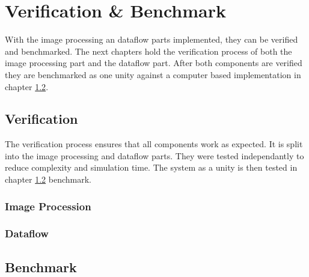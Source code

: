 %
%
\chapter{Verification \& Benchmark} \label{chapt:ver_bench}
With the image processing an dataflow parts implemented, they can be verified
and benchmarked. The next chapters hold the verification process of both the
image processing part and the dataflow part. After both components are verified
they are benchmarked as one unity against a computer based implementation in
chapter \ref{ch:benchmark}.

%
%
\section{Verification} \label{ch:verification}
The verification process ensures that all components work as expected. It is
split into the image processing and dataflow parts. They were tested
independantly to reduce complexity and simulation time. The system as a unity is
then tested in chapter \ref{ch:benchmark} benchmark.

%
%
\subsection{Image Procession}\label{ch:verification:imageprocessing}

%
%
\subsection{Dataflow}\label{ch:verification:dataflow}

%
%
\section{Benchmark}\label{ch:benchmark}

